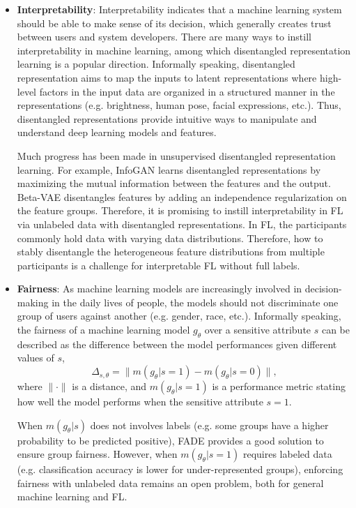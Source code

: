 \documentclass[11pt]{article}
\begin{document}
\begin{itemize}
    \item \textbf{Interpretability}: Interpretability indicates that a machine learning system should be able to make sense of its decision, which generally creates trust between users and system developers. There are many ways to instill interpretability in machine learning, among which disentangled representation learning \cite{Yilun-lee2018diverse} is a popular direction. Informally speaking, disentangled representation aims to map the inputs to latent representations where high-level factors in the input data are organized in a structured manner in the representations (e.g. brightness, human pose, facial expressions, etc.). Thus, disentangled representations provide intuitive ways to manipulate and understand deep learning models and features.

    Much progress has been made in unsupervised disentangled representation learning. For example, InfoGAN \cite{Yilun-chen2016infogan} learns disentangled representations by maximizing the mutual information between the features and the output. Beta-VAE \cite{Yilun-higgins2017beta} disentangles features by adding an independence regularization on the feature groups. Therefore, it is promising to instill interpretability in FL via unlabeled data with disentangled representations. In FL, the participants commonly hold data with varying data distributions. Therefore, how to stably disentangle the heterogeneous feature distributions from multiple participants is a challenge for interpretable FL without full labels.

    \item \textbf{Fairness}: As machine learning models are increasingly involved in decision-making in the daily lives of people, the models should not discriminate one group of users against another (e.g. gender, race, etc.). Informally speaking, the fairness of a machine learning model $g_\theta$ over a sensitive attribute $s$ can be described as the difference between the model performances given different values of $s$,
    \begin{equation}
        \Delta_{s, \theta} = \|m(g_\theta|s=1) - m(g_\theta|s=0)\|,
        \label{eqn:fairness}
    \end{equation}
    where $\|\cdot \|$ is a distance, and $m(g_\theta|s=1)$ is a performance metric stating how well the model performs when the sensitive attribute $s=1$.

    When $m(g_\theta|s)$ does not involves labels (e.g. some groups have a higher probability to be predicted positive), FADE \cite{Yilun-hong2021federated} provides a good solution to ensure group fairness. However, when $m(g_\theta|s=1)$ requires labeled data (e.g. classification accuracy is lower for under-represented groups), enforcing fairness with unlabeled data remains an open problem, both for general machine learning and FL.
\end{itemize}
\end{document}
